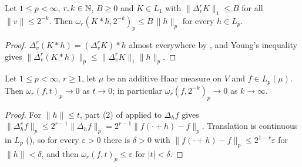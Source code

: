 \begin{lemma}
\label{lem:rd-modulus-conv}
\leanok
{}
Let $1 \leq p < \infty$, $r, k \in \mathbb{N}$, $B \geq 0$ and $K \in L_1$ with
$\|\Delta_v^r K\|_1 \leq B$ for all $\|v\| \leq 2^{-k}$. Then
$\omega_r(K * h, 2^{-k})_p \leq B \, \|h\|_p$ for every $h \in L_p$.
\end{lemma}

\begin{proof}
\leanok
$\Delta_v^r (K * h) = (\Delta_v^r K) * h$ almost everywhere by , and
Young's inequality gives $\|\Delta_v^r (K * h)\|_p \leq \|\Delta_v^r K\|_1 \|h\|_p$.
\end{proof}

\begin{lemma}
\label{lem:modulus-to-zero}
\leanok
{}
Let $1 \leq p < \infty$, $r \geq 1$, let $\mu$ be an additive Haar measure on $V$ and
$f \in L_p(\mu)$. Then $\omega_r(f, t)_p \to 0$ as $t \to 0$; in particular
$\omega_r(f, 2^{-k})_p \to 0$ as $k \to \infty$.
\end{lemma}

\begin{proof}
\leanok
{}
For $\|h\| \leq t$, part (2) of  applied to $\Delta_h f$ gives
$\|\Delta_h^r f\|_p \leq 2^{r-1} \|\Delta_h f\|_p = 2^{r-1} \|f(\cdot + h) - f\|_p$. Translation is
continuous in $L_p$ (), so for every $\varepsilon > 0$ there is
$\delta > 0$ with $\|f(\cdot + h) - f\|_p \leq 2^{1-r} \varepsilon$ for $\|h\| < \delta$, and then
$\omega_r(f, t)_p \leq \varepsilon$ for $|t| < \delta$.
\end{proof}

